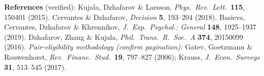 \documentclass[11pt]{article}
\begin{document}
\smallskip
\noindent\textbf{References} {\small(verified):} Kujala, Dzhafarov \& Larsson,
\emph{Phys.\ Rev.\ Lett.}\ \textbf{115}, 150401 (2015). \;Cervantes \& Dzhafarov,
\emph{Decision} \textbf{5}, 193--204 (2018). \;Basieva, Cervantes, Dzhafarov \& Khrennikov,
\emph{J.\ Exp.\ Psychol.: General} \textbf{148}, 1925--1937 (2019). \;Dzhafarov, Zhang \&
Kujala, \emph{Phil.\ Trans.\ R.\ Soc.\ A} \textbf{374}, 20150099 (2016).
\;\emph{Pair-eligibility methodology (confirm pagination):} Gatev, Goetzmann \& Rouwenhorst,
\emph{Rev.\ Financ.\ Stud.}\ \textbf{19}, 797--827 (2006); Krauss, \emph{J.\ Econ.\ Surveys}
\textbf{31}, 513--545 (2017).
\end{document}
